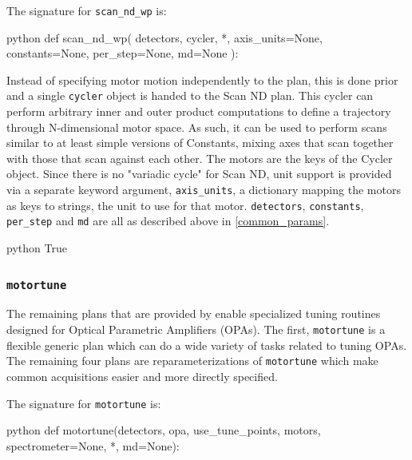The signature for \texttt{scan\_nd\_wp} is:

\begin{codefragment}{python}
def scan_nd_wp(
    detectors, cycler, *, axis_units=None, constants=None, per_step=None, md=None
):
\end{codefragment}

Instead of specifying motor motion independently to the plan, this is done prior and a single \texttt{cycler}\cite{} object is handed to the Scan ND plan.
This cycler can perform arbitrary inner and outer product computations to define a trajectory through N-dimensional motor space.
As such, it can be used to perform scans similar to at least simple versions of Constants, mixing axes that scan together with those that scan against each other.
The motors are the keys of the Cycler object.
Since there is no "variadic cycle" for Scan ND, \wrightplans unit support is provided via a separate keyword argument, \texttt{axis\_units}, a dictionary mapping the motors as keys to strings, the unit to use for that motor.
\texttt{detectors}, \texttt{constants}, \texttt{per\_step} and \texttt{md} are all as described above in \ref{common_params}.

\begin{codefragment}{python}
True
\end{codefragment}


\subsubsection{\texttt{motortune}}

The remaining plans that are provided by \wrightplans enable specialized tuning routines designed for Optical Parametric Amplifiers (OPAs).
The first, \texttt{motortune} is a flexible generic plan which can do a wide variety of tasks related to tuning OPAs.
The remaining four plans are reparameterizations of \texttt{motortune} which make common acquisitions easier and more directly specified.

The signature for \texttt{motortune} is:

\begin{codefragment}{python}
def motortune(detectors, opa, use_tune_points, motors, spectrometer=None, *, md=None):
\end{codefragment}

